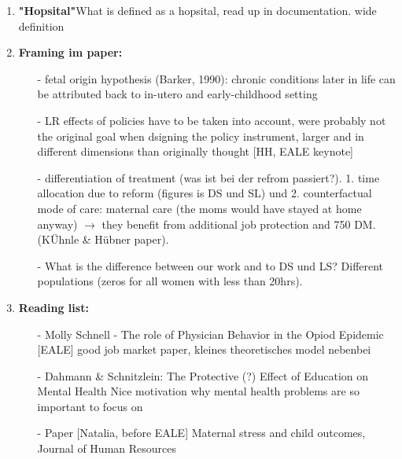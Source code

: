 \documentclass[11pt,a4paper]{article}
\begin{document}
\begin{enumerate}
\item \textbf{"Hopsital"}\newline What is defined as a hopsital, read up in documentation. wide definition


\item \textbf{Framing im paper:} \vspace{-1em}
\begin{itemize}
\item[-] fetal origin hypothesis (Barker, 1990): chronic conditions later in life can be attributed back to in-utero and early-childhood setting
\item[-] LR effects of policies have to be taken into account, were probably not the original goal when dsigning the policy instrument, larger and in different dimensions than originally thought [HH, EALE keynote]
\item[-] differentiation of treatment (was ist bei der refrom passiert?). 1. time allocation due to reform (figures is DS und SL) und 2. counterfactual mode of care: maternal care (the moms would have stayed at home anyway) $\rightarrow$ they benefit from additional job protection and 750 DM.
(KÜhnle \& Hübner paper).
\item[-] What is the difference between our work and to DS und LS? Different populations (zeros for all women with less than 20hrs).
\end{itemize}

\item \textbf{Reading list:}
\begin{itemize}
\item[-] Molly Schnell - The role of Physician Behavior in the Opiod Epidemic [EALE]\newline
good job market paper, kleines theoretisches model nebenbei
\item[-]  Dahmann \& Schnitzlein: The Protective (?) Effect of Education on Mental Health   \newline
 Nice motivation why mental health problems are so important to focus on 
 \item[-] Paper [Natalia, before EALE] Maternal stress and child outcomes, Journal of Human Resources

\end{itemize}

\end{enumerate}
\end{document}
